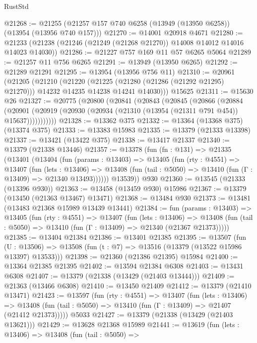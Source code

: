 \begin{lexlean}{RustStd}
\begin{coremodule}
@21268 := @21255 (@21257 @157 @740 @6258 (@13949 (@13950 @6258)) (@13954 (@13956 @740 @157)))
@21270 := @14001 @20918 @4671
@21280 := @21233 (@21238 (@21246 (@21249 (@21268 @21270)) @14008 @14012 @14016 @14023 @14030))
@21286 := @21227 @757 @169 @11 @57 @6265 @5064
@21289 := @21257 @11 @756 @6265
@21291 := @13949 (@13950 @6265)
@21292 := @21289 @21291
@21295 := @13954 (@13956 @756 @11)
@21310 := @20961
    (@21205
      (@21210
        (@21220
          (@21225 (@21280 (@21286 (@21292 @21295) @21270)))
          @14232
          @14235
          @14238
          @14241
          @14030)))
    @15625
@21311 := @15630 @26
@21327 := @20775
    (@20800
      (@20841
        (@20843
          (@20845
            (@20866
              (@20884
                (@20901
                  (@20919 (@20930 (@20934 (@21310 (@13954 (@21311 @791 @454)) @15637)))))))))))
@21328 := @13362 @375
@21332 := @13364 (@13368 @375) (@13374 @375)
@21333 := @13383 @15983
@21335 := @13379 (@21333 @13398)
@21337 := @13421 (@13422 @375)
@21338 := @13417 @21337
@21340 := @13379 (@21338 @13446)
@21357 := @13378
    (fun (fn : @131) =>
    @21335
      (@13401
        (@13404
          (fun (params : @13403) =>
          @13405
            (fun (rty : @4551) =>
            @13407
              (fun (lets : @13406) =>
              @13408 (fun (tail : @5050) => @13410 (fun (Γ : @13409) => @21340 @13493))))))
        @13539))
    @930
@21360 := @13545 (@21333 (@13396 @930))
@21363 := @13458 (@13459 @930) @15986
@21367 := @13379 (@13450 (@21363 @13467) @13471)
@21368 := @13484 @930
@21373 := @13481 (@13483 @21368 @15989 @13439 @13441)
@21384 := fun (params : @13403) =>
  @13405
    (fun (rty : @4551) =>
    @13407
      (fun (lets : @13406) =>
      @13408 (fun (tail : @5050) => @13410 (fun (Γ : @13409) => @21340 (@21367 @21373)))))
@21385 := @13404 @21384
@21386 := @13401 @21385
@21395 := @13507
    (fun (U : @13506) => @13508 (fun (t : @7) => @13516 (@13379 (@13522 @15986 @13397) @13533)))
@21398 := @21360 (@21386 @21395) @15984
@21400 := @13364 @21385 @21395
@21402 := @13594 @21384 @6308
@21403 := @13431 @6308
@21407 := @13379 (@21338 (@13429 (@21403 @13444)))
@21409 := @21363 (@13466 @6308)
@21410 := @13450 @21409
@21412 := @13379 (@21410 @13471)
@21423 := @13597
    (fun (rty : @4551) =>
    @13407
      (fun (lets : @13406) =>
      @13408 (fun (tail : @5050) => @13410 (fun (Γ : @13409) => @21407 (@21412 @21373)))))
    @5033
@21427 := @13379 (@21338 (@13429 (@21403 @13621)))
@21429 := @13628 @21368 @15989
@21441 := @13619
    (fun (lets : @13406) =>
    @13408
      (fun (tail : @5050) =>

\end{coremodule}
\end{lexlean}
